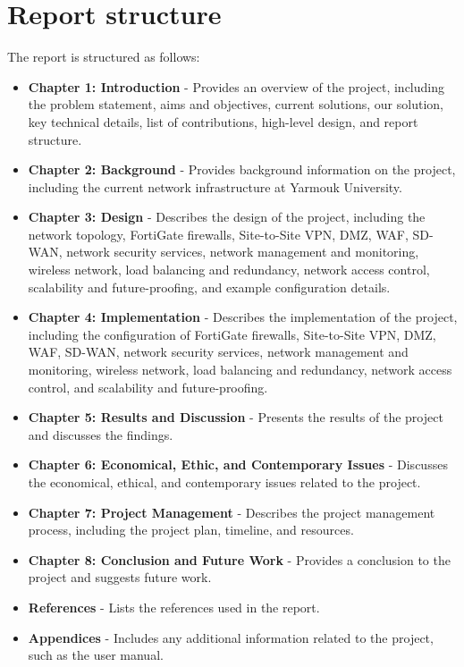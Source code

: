 \documentclass[12pt]{report}
\begin{document}
\section{Report structure}
The report is structured as follows:
\begin{itemize}
    \item \textbf{Chapter 1: Introduction} - Provides an overview of the project, including the problem statement, aims and objectives, current solutions, our solution, key technical details, list of contributions, high-level design, and report structure.
    \item \textbf{Chapter 2: Background} - Provides background information on the project, including the current network infrastructure at Yarmouk University.
    \item \textbf{Chapter 3: Design} - Describes the design of the project, including the network topology, FortiGate firewalls, Site-to-Site VPN, DMZ, WAF, SD-WAN, network security services, network management and monitoring, wireless network, load balancing and redundancy, network access control, scalability and future-proofing, and example configuration details.
    \item \textbf{Chapter 4: Implementation} - Describes the implementation of the project, including the configuration of FortiGate firewalls, Site-to-Site VPN, DMZ, WAF, SD-WAN, network security services, network management and monitoring, wireless network, load balancing and redundancy, network access control, and scalability and future-proofing.
    \item \textbf{Chapter 5: Results and Discussion} - Presents the results of the project and discusses the findings.
    \item \textbf{Chapter 6: Economical, Ethic, and Contemporary Issues} - Discusses the economical, ethical, and contemporary issues related to the project.

    \item \textbf{Chapter 7: Project Management} - Describes the project management process, including the project plan, timeline, and resources.
    \item \textbf{Chapter 8: Conclusion and Future Work} - Provides a conclusion to the project and suggests future work.
    \item \textbf{References} - Lists the references used in the report.
    \item \textbf{Appendices} - Includes any additional information related to the project, such as the user manual.
\end{itemize}
\end{document}
